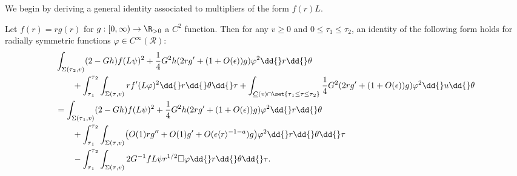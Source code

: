 \documentclass[10pt, reqno]{amsart}
\begin{document}
We begin by deriving a general identity associated to multipliers of the form
\(f(r)L\).
\begin{lemma}
Let \(f(r) = rg(r)\) for \(g : [0,\infty)\to \R_{>0}\) a \(C^2\) function. Then for any
\(v\ge 0\) and \(0\le \tau_1\le \tau_2\), an identity of the following form
holds for radially symmetric functions \(\varphi{}\in C^\infty(\mathcal{R})\):
\begin{equation}\label{prelim-r-estimate-identity}
\begin{split}
&\int _{\Sigma{}(\tau{}_2,v)} (2-Gh)f(L\psi{})^2 + \frac{1}{4}G^2h(2rg' + (1 + O(\epsilon{}))g)\varphi^2\dd{}r\dd{}\theta{} \\
&\qquad + \int_{\tau{}_1}^{\tau{}_2} \int _{\Sigma{}(\tau{},v)} rf'(L\varphi{})^2\dd{}r\dd{}\theta{}\dd{}\tau{}  + \int _{\underline{C}(v)\cap \set{\tau{}_1\le \tau{}\le \tau{}_2}} \frac{1}{4}G^2(2rg' + (1 + O(\epsilon{}))g)\varphi^2 \dd{}u\dd{}\theta{} \\
&= \int _{\Sigma{}(\tau{}_1,v)} (2-Gh)f(L\psi{})^2 + \frac{1}{4}G^2h(2rg' + (1 + O(\epsilon{}))g)\varphi^2\dd{}r\dd{}\theta{} \\
&\qquad + \int_{\tau{}_1}^{\tau{}_2} \int _{\Sigma{}(\tau{},v)}\bigl(O(1)rg'' + O(1)g' + O(\epsilon{}\langle{}r\rangle^{-1-a})g\bigr)\varphi^2 \dd{}r\dd{}\theta{}\dd{}\tau{} \\
&\qquad - \int_{\tau{}_1}^{\tau{}_2}\int _{\Sigma{}(\tau{},v)} 2G^{-1}fL\psi{}r^{1/2}\Box{}\varphi{}\dd{}r\dd{}\theta{}\dd{}\tau{}.
\end{split}
\end{equation}
\label{r-estimate-prep}
\end{lemma}
\end{document}
